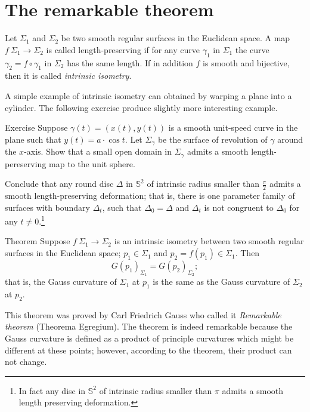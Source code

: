 \section*{The remarkable theorem}

Let $\Sigma_1$ and $\Sigma_2$ be two smooth regular surfaces in the Euclidean space.
A map $f\:\Sigma_1\to \Sigma_2$ is called  length-preserving if for any curve $\gamma_1$ in $\Sigma_1$ the curve $\gamma_2=f\circ\gamma_1$ in $\Sigma_2$ has the same length. %
If in addition $f$ is smooth and bijective, then it is called \emph{intrinsic isometry}. 

A simple example of intrinsic isometry can obtained by warping a plane into a cylinder.
The following exercise produce slightly more interesting example.

\begin{thm}{Exercise}\label{ex:deformation}
Suppose $\gamma(t)=(x(t),y(t))$ is a smooth unit-speed curve in the plane such that $y(t)=a\cdot \cos t$.
Let $\Sigma_\gamma$ be the surface of revolution of $\gamma$ around the $x$-axis.
Show that a small open domain in $\Sigma_\gamma$ admits a smooth length-pereserving map to the unit sphere.

Conclude that any round disc $\Delta$ in $\mathbb{S}^2$ of intrinsic radius smaller than $\tfrac\pi2$ admits a smooth length-preserving deformation; that is, there is one parameter family of surfaces with boundary $\Delta_t$, such that $\Delta_0=\Delta$ and $\Delta_t$ is not congruent to $\Delta_0$ for any $t\ne0$.\footnote{In fact any disc in $\mathbb{S}^2$ of intrinsic radius smaller than $\pi$ admits a smooth length preserving deformation. %
}
\end{thm}


\begin{thm}{Theorem}\label{thm:remarkable}
Suppose $f\:\Sigma_1\to \Sigma_2$ is an intrinsic isometry between two smooth regular surfaces in  the Euclidean space; $p_1\in \Sigma_1$ and $p_2=f(p_1)\in \Sigma_1$.
Then 
\[G(p_1)_{\Sigma_1}=G(p_2)_{\Sigma_2};\]
that is, the Gauss curvature of $\Sigma_1$ at $p_1$ is the same as the Gauss curvature of $\Sigma_2$ at $p_2$.
\end{thm}

This theorem was proved by Carl Friedrich Gauss \cite{gauss} who called it \emph{Remarkable theorem} (Theorema Egregium).
The theorem is indeed remarkable because the Gauss curvature is defined as a product of principle curvatures which might be different at these points; however, according to the theorem, their product can not change.

